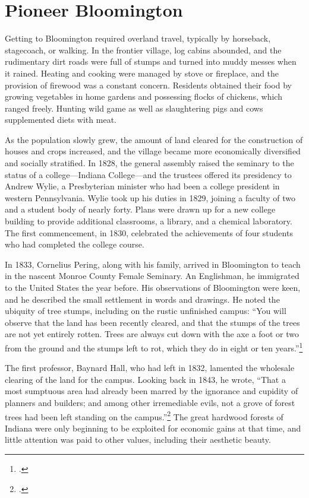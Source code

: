 \documentclass[
  american,
  letterpaper,
]{scrreprt}
\begin{document}
\section{Pioneer Bloomington}\label{pioneer-bloomington}

Getting to Bloomington required overland travel, typically by horseback,
stagecoach, or walking. In the frontier village, log cabins abounded,
and the rudimentary dirt roads were full of stumps and turned into muddy
messes when it rained. Heating and cooking were managed by stove or
fireplace, and the provision of firewood was a constant concern.
Residents obtained their food by growing vegetables in home gardens and
possessing flocks of chickens, which ranged freely. Hunting wild game as
well as slaughtering pigs and cows supplemented diets with meat.

As the population slowly grew, the amount of land cleared for the
construction of houses and crops increased, and the village became more
economically diversified and socially stratified. In 1828, the general
assembly raised the seminary to the status of a college---Indiana
College---and the trustees offered its presidency to Andrew Wylie, a
Presbyterian minister who had been a college president in western
Pennsylvania. Wylie took up his duties in 1829, joining a faculty of two
and a student body of nearly forty. Plans were drawn up for a new
college building to provide additional classrooms, a library, and a
chemical laboratory. The first commencement, in 1830, celebrated the
achievements of four students who had completed the college course.

In 1833, Cornelius Pering, along with his family, arrived in Bloomington
to teach in the nascent Monroe County Female Seminary. An Englishman, he
immigrated to the United States the year before. His observations of
Bloomington were keen, and he described the small settlement in words
and drawings. He noted the ubiquity of tree stumps, including on the
rustic unfinished campus: ``You will observe that the land has been
recently cleared, and that the stumps of the trees are not yet entirely
rotten. Trees are always cut down with the axe a foot or two from the
ground and the stumps left to rot, which they do in eight or ten
years.''\footnote{.}

The first professor, Baynard Hall, who had left in 1832, lamented the
wholesale clearing of the land for the campus. Looking back in 1843, he
wrote, ``That a most sumptuous area had already been marred by the
ignorance and cupidity of planners and builders; and among other
irremediable evils, not a grove of forest trees had been left standing
on the campus.''\footnote{.} The
great hardwood forests of Indiana were only beginning to be exploited
for economic gains at that time, and little attention was paid to other
values, including their aesthetic beauty.
\end{document}
